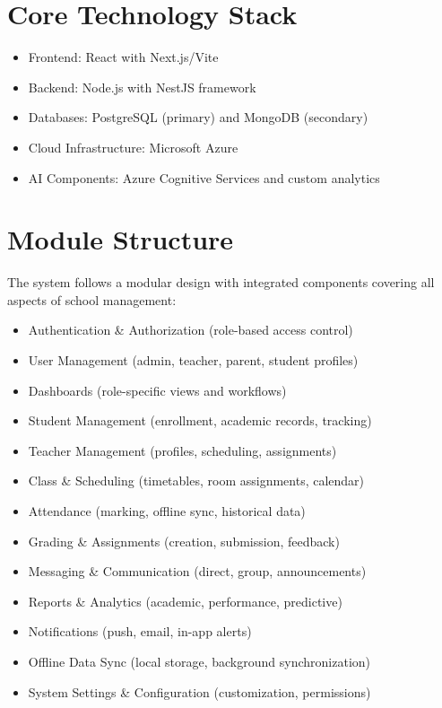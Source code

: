 \documentclass[11pt]{report}
\begin{document}
\section{Core Technology Stack}
\begin{itemize}
    \item Frontend: React with Next.js/Vite
    \item Backend: Node.js with NestJS framework
    \item Databases: PostgreSQL (primary) and MongoDB (secondary)
    \item Cloud Infrastructure: Microsoft Azure
    \item AI Components: Azure Cognitive Services and custom analytics
\end{itemize}

\section{Module Structure}
The system follows a modular design with integrated components covering all aspects of school management:

\begin{itemize}
    \item Authentication \& Authorization (role-based access control)
    \item User Management (admin, teacher, parent, student profiles)
    \item Dashboards (role-specific views and workflows)
    \item Student Management (enrollment, academic records, tracking)
    \item Teacher Management (profiles, scheduling, assignments)
    \item Class \& Scheduling (timetables, room assignments, calendar)
    \item Attendance (marking, offline sync, historical data)
    \item Grading \& Assignments (creation, submission, feedback)
    \item Messaging \& Communication (direct, group, announcements)
    \item Reports \& Analytics (academic, performance, predictive)
    \item Notifications (push, email, in-app alerts)
    \item Offline Data Sync (local storage, background synchronization)
    \item System Settings \& Configuration (customization, permissions)
\end{itemize}
\end{document}
